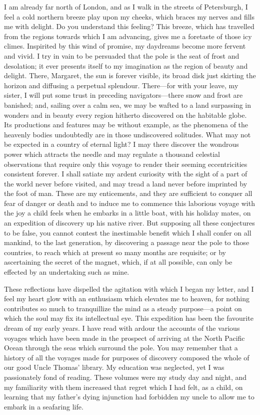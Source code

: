 I am already far north of London, and as I walk in the streets of Petersburgh, I feel a cold northern breeze play upon my cheeks, which braces my nerves and fills me with delight. Do you understand this feeling? This breeze, which has travelled from the regions towards which I am advancing, gives me a foretaste of those icy climes. Inspirited by this wind of promise, my daydreams become more fervent and vivid. I try in vain to be persuaded that the pole is the seat of frost and desolation; it ever presents itself to my imagination as the region of beauty and delight. There, Margaret, the sun is forever visible, its broad disk just skirting the horizon and diffusing a perpetual splendour. There---for with your leave, my sister, I will put some trust in preceding navigators---there snow and frost are banished; and, sailing over a calm sea, we may be wafted to a land surpassing in wonders and in beauty every region hitherto discovered on the habitable globe. Its productions and features may be without example, as the phenomena of the heavenly bodies undoubtedly are in those undiscovered solitudes. What may not be expected in a country of eternal light? I may there discover the wondrous power which attracts the needle and may regulate a thousand celestial observations that require only this voyage to render their seeming eccentricities consistent forever. I shall satiate my ardent curiosity with the sight of a part of the world never before visited, and may tread a land never before imprinted by the foot of man. These are my enticements, and they are sufficient to conquer all fear of danger or death and to induce me to commence this laborious voyage with the joy a child feels when he embarks in a little boat, with his holiday mates, on an expedition of discovery up his native river. But supposing all these conjectures to be false, you cannot contest the inestimable benefit which I shall confer on all mankind, to the last generation, by discovering a passage near the pole to those countries, to reach which at present so many months are requisite; or by ascertaining the secret of the magnet, which, if at all possible, can only be effected by an undertaking such as mine.

These reflections have dispelled the agitation with which I began my letter, and I feel my heart glow with an enthusiasm which elevates me to heaven, for nothing contributes so much to tranquillize the mind as a steady purpose---a point on which the soul may fix its intellectual eye. This expedition has been the favourite dream of my early years. I have read with ardour the accounts of the various voyages which have been made in the prospect of arriving at the North Pacific Ocean through the seas which surround the pole. You may remember that a history of all the voyages made for purposes of discovery composed the whole of our good Uncle Thomas' library. My education was neglected, yet I was passionately fond of reading. These volumes were my study day and night, and my familiarity with them increased that regret which I had felt, as a child, on learning that my father's dying injunction had forbidden my uncle to allow me to embark in a seafaring life.

